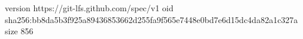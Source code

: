 version https://git-lfs.github.com/spec/v1
oid sha256:bb8da5b3f925a89436853662d255fa9f565e7448e0bd7e6d15dc4da82a1c327a
size 856
